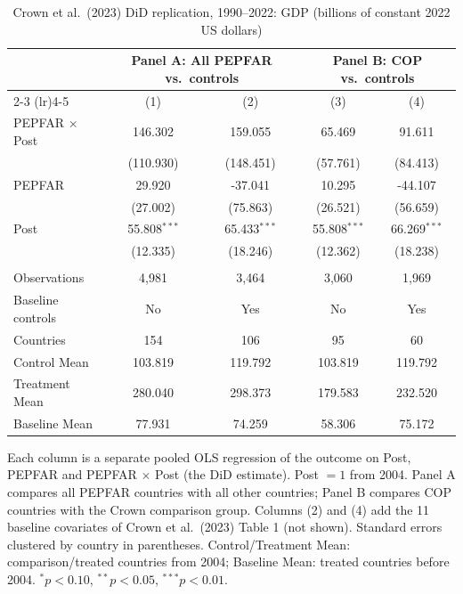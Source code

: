 
\begin{table}[htbp]
   \caption{\label{tab:crown_did_gdp} Crown et al.\ (2023) DiD replication, 1990--2022: GDP (billions of constant 2022 US dollars)}
   \bigskip
   \centering
   \begin{tabular}{lcccc}
      \toprule
       & \multicolumn{2}{c}{Panel A: All PEPFAR vs.\ controls} & \multicolumn{2}{c}{Panel B: COP vs.\ controls} \\ \cmidrule(lr){2-3} \cmidrule(lr){4-5}
                            & (1)            & (2)            & (3)            & (4)\\  
      \midrule 
      PEPFAR $\times$ Post  & 146.302        & 159.055        & 65.469         & 91.611\\   
                            & (110.930)      & (148.451)      & (57.761)       & (84.413)\\   
      PEPFAR                & 29.920         & -37.041        & 10.295         & -44.107\\   
                            & (27.002)       & (75.863)       & (26.521)       & (56.659)\\   
      Post                  & 55.808$^{***}$ & 65.433$^{***}$ & 55.808$^{***}$ & 66.269$^{***}$\\   
                            & (12.335)       & (18.246)       & (12.362)       & (18.238)\\   
       \\
      Observations          & 4,981          & 3,464          & 3,060          & 1,969\\  
      Baseline controls     & No             & Yes            & No             & Yes\\  
      Countries             & 154            & 106            & 95             & 60\\  
      Control Mean          & 103.819        & 119.792        & 103.819        & 119.792\\  
      Treatment Mean        & 280.040        & 298.373        & 179.583        & 232.520\\  
      Baseline Mean         & 77.931         & 74.259         & 58.306         & 75.172\\  
      \bottomrule
   \end{tabular}
   
   \par \raggedright 
   Each column is a separate pooled OLS regression of the outcome on Post, PEPFAR and PEPFAR $\times$ Post (the DiD estimate). Post $= 1$ from 2004. Panel A compares all PEPFAR countries with all other countries; Panel B compares COP countries with the Crown comparison group. Columns (2) and (4) add the 11 baseline covariates of Crown et al.\ (2023) Table 1 (not shown). Standard errors clustered by country in parentheses. Control/Treatment Mean: comparison/treated countries from 2004; Baseline Mean: treated countries before 2004. $^{*}p<0.10$, $^{**}p<0.05$, $^{***}p<0.01$.
\end{table}


